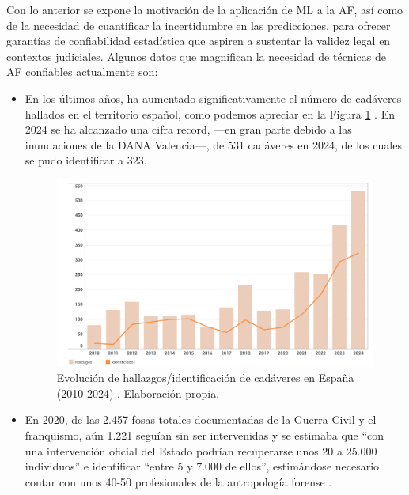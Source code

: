 Con lo anterior se expone la motivación de la aplicación de ML a la AF, así como de la necesidad de 
cuantificar la incertidumbre en las predicciones, para ofrecer garantías de confiabilidad estadística que 
aspiren a sustentar la validez legal en contextos judiciales. Algunos datos que magnifican la necesidad de 
técnicas de AF confiables actualmente son:


\begin{itemize}

    \item En los últimos años, ha aumentado significativamente el número de cadáveres hallados en el 
    territorio español, como podemos apreciar en la Figura \ref{fig:evolucion_hallazgosID_cadaveres} 
    \cite{interior2025desaparecidos}. 
    En 2024 se ha alcanzado una cifra record, ---en gran parte debido a las inundaciones de la DANA 
    Valencia---, de 531 cadáveres en 2024, de los cuales se pudo identificar a 323.

    \begin{figure}[h]
        \centering
        \includegraphics[width=\textwidth]{capitulos/cap_01/imagenes/hallazgos_cadaveres.png}
        \caption[
            Evolución de hallazgos/identificación de cadáveres en España (2010-2024) 
            \cite{interior2025desaparecidos}.
        ]{
            Evolución de hallazgos/identificación de cadáveres en España (2010-2024) 
            \cite{interior2025desaparecidos}. Elaboración propia.
        } 
        \label{fig:evolucion_hallazgosID_cadaveres}
    \end{figure}

    \item En 2020, de las 2.457 fosas totales documentadas de la Guerra Civil y el franquismo, aún 1.221 
    seguían sin ser intervenidas y se estimaba que ``con una intervención oficial del Estado podrían 
    recuperarse unos 20 a 25.000 individuos'' e identificar ``entre 5 y 7.000 de ellos'', estimándose 
    necesario contar con unos 40-50 profesionales de la antropología forense \cite{etxeberria2020}. 


\end{itemize}
